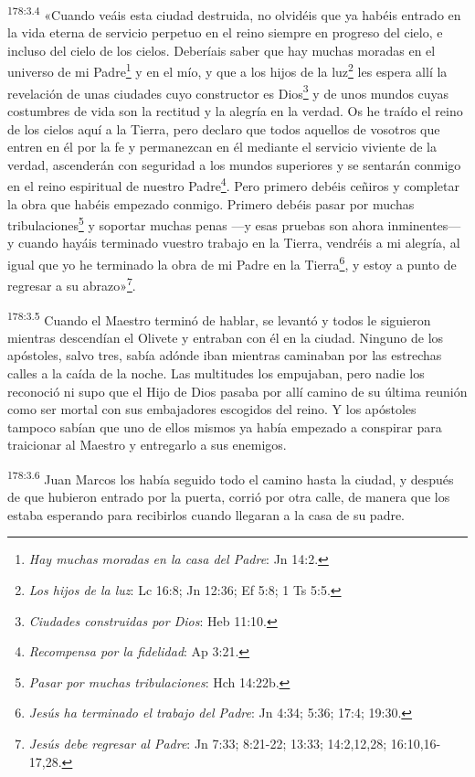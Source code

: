 \par 
\textsuperscript{178:3.4} «Cuando veáis esta ciudad destruida, no olvidéis que ya habéis entrado en la vida eterna de servicio perpetuo en el reino siempre en progreso del cielo, e incluso del cielo de los cielos. Deberíais saber que hay muchas moradas en el universo de mi Padre\footnote{\textit{Hay muchas moradas en la casa del Padre}: Jn 14:2.} y en el mío, y que a los hijos de la luz\footnote{\textit{Los hijos de la luz}: Lc 16:8; Jn 12:36; Ef 5:8; 1 Ts 5:5.} les espera allí la revelación de unas ciudades cuyo constructor es Dios\footnote{\textit{Ciudades construidas por Dios}: Heb 11:10.} y de unos mundos cuyas costumbres de vida son la rectitud y la alegría en la verdad. Os he traído el reino de los cielos aquí a la Tierra, pero declaro que todos aquellos de vosotros que entren en él por la fe y permanezcan en él mediante el servicio viviente de la verdad, ascenderán con seguridad a los mundos superiores y se sentarán conmigo en el reino espiritual de nuestro Padre\footnote{\textit{Recompensa por la fidelidad}: Ap 3:21.}. Pero primero debéis ceñiros y completar la obra que habéis empezado conmigo. Primero debéis pasar por muchas tribulaciones\footnote{\textit{Pasar por muchas tribulaciones}: Hch 14:22b.} y soportar muchas penas ---y esas pruebas son ahora inminentes--- y cuando hayáis terminado vuestro trabajo en la Tierra, vendréis a mi alegría, al igual que yo he terminado la obra de mi Padre en la Tierra\footnote{\textit{Jesús ha terminado el trabajo del Padre}: Jn 4:34; 5:36; 17:4; 19:30.}, y estoy a punto de regresar a su abrazo»\footnote{\textit{Jesús debe regresar al Padre}: Jn 7:33; 8:21-22; 13:33; 14:2,12,28; 16:10,16-17,28.}.

\par 
\textsuperscript{178:3.5} Cuando el Maestro terminó de hablar, se levantó y todos le siguieron mientras descendían el Olivete y entraban con él en la ciudad. Ninguno de los apóstoles, salvo tres, sabía adónde iban mientras caminaban por las estrechas calles a la caída de la noche. Las multitudes los empujaban, pero nadie los reconoció ni supo que el Hijo de Dios pasaba por allí camino de su última reunión como ser mortal con sus embajadores escogidos del reino. Y los apóstoles tampoco sabían que uno de ellos mismos ya había empezado a conspirar para traicionar al Maestro y entregarlo a sus enemigos.

\par 
\textsuperscript{178:3.6} Juan Marcos los había seguido todo el camino hasta la ciudad, y después de que hubieron entrado por la puerta, corrió por otra calle, de manera que los estaba esperando para recibirlos cuando llegaran a la casa de su padre.